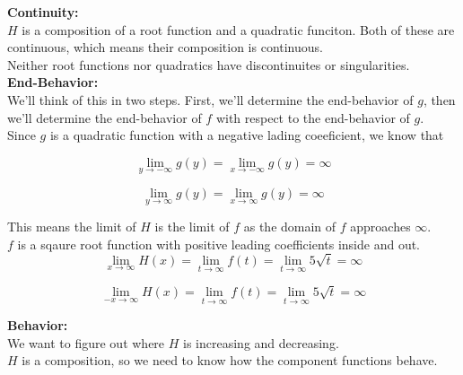 \documentclass{ximera}
\begin{document}
\textbf{\textcolor{blue!55!black}{Continuity:}} \\


$H$ is a composition of a root function and a quadratic funciton.  Both of these are continuous, which means their composition is continuous. \\

Neither root functions nor quadratics have discontinuites or singularities. \\





\textbf{\textcolor{blue!55!black}{End-Behavior:}} \\



We'll think of this in two steps. First, we'll determine the end-behavior of $g$, then we'll determine the end-behavior of $f$ with respect to the end-behavior of $g$.\\


Since $g$ is a quadratic function with a negative lading coeeficient, we know that 

\[
\lim\limits_{y \to -\infty} g(y) = \lim\limits_{x \to -\infty} g(y)  = \infty
\]


\[
\lim\limits_{y \to \infty} g(y) = \lim\limits_{x \to \infty} g(y)  = \infty
\]

This means the limit of $H$ is the limit of $f$ as the domain of $f$ approaches $\infty$. \\


$f$ is a sqaure root function with positive leading coefficients inside and out. \\

\[
\lim\limits_{x \to \infty} H(x) =  \lim\limits_{t \to \infty} f(t)  = \lim\limits_{t \to \infty} 5\sqrt{t} = \infty
\]


\[
\lim\limits_{-x \to \infty} H(x) =  \lim\limits_{t \to \infty} f(t)  = \lim\limits_{t \to \infty} 5\sqrt{t} = \infty
\]









\textbf{\textcolor{blue!55!black}{Behavior:}} \\


We want to figure out where $H$ is increasing and decreasing. \\

$H$ is a composition, so we need to know how the component functions behave. \\
\end{document}
